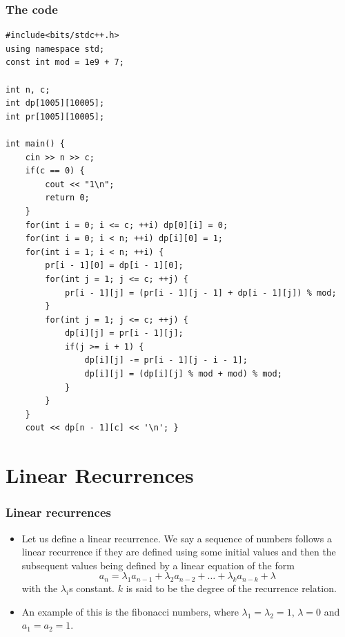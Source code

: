\documentclass{beamer}
\begin{document}
\begin{frame}
\frametitle{The code}

\begin{tiny}
\begin{verbatim}
#include<bits/stdc++.h>
using namespace std;
const int mod = 1e9 + 7;

int n, c;
int dp[1005][10005];
int pr[1005][10005];

int main() {
    cin >> n >> c;
    if(c == 0) {
        cout << "1\n";
        return 0;
    }
    for(int i = 0; i <= c; ++i) dp[0][i] = 0;
    for(int i = 0; i < n; ++i) dp[i][0] = 1;
    for(int i = 1; i < n; ++i) {
        pr[i - 1][0] = dp[i - 1][0];
        for(int j = 1; j <= c; ++j) {
            pr[i - 1][j] = (pr[i - 1][j - 1] + dp[i - 1][j]) % mod;
        }
        for(int j = 1; j <= c; ++j) {
            dp[i][j] = pr[i - 1][j];
            if(j >= i + 1) {
                dp[i][j] -= pr[i - 1][j - i - 1];
                dp[i][j] = (dp[i][j] % mod + mod) % mod;
            }
        }
    }
    cout << dp[n - 1][c] << '\n'; }
\end{verbatim}
\end{tiny}

\end{frame}

\section*{Linear Recurrences}

\begin{frame}[plain]
\frametitle{Linear recurrences}

\begin{itemize}

\item Let us define a linear recurrence. We say a sequence of numbers follows a linear recurrence if they are defined using some initial values and then the subsequent values being defined by a linear equation of the form
\[a_n = \lambda_1 a_{n - 1} + \lambda_2 a_{n - 2} + \dots + \lambda_k a_{n - k} + \lambda\]
with the $\lambda_i$s constant. $k$ is said to be the degree of the recurrence relation.

\item An example of this is the fibonacci numbers, where $\lambda_1 = \lambda_2 = 1$, $\lambda = 0$ and $a_1 = a_2 = 1$.

\end{itemize}

\end{frame}
\end{document}

